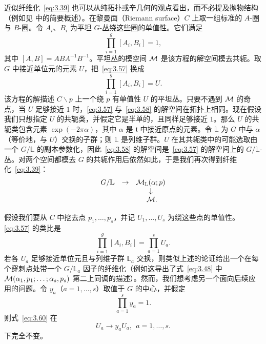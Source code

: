 近似纤维化~\eqref{eq:3.39} 也可以从纯拓扑或辛几何的观点看出，而不必提及抛物结构（例如见 \cite{ref56} 中的简要概述）。在黎曼面（Riemann surface）$C$ 上取一组标准的 $A$-圈与 $B$-圈。令 $A_i$、$B_i$ 为平坦 $G$-丛绕这些圈的单值性。它们满足
\setcounter{equation}{56}
\begin{equation}\label{eq:3.57}
  \prod_{i=1}^g[A_i,B_i]=1,
\end{equation}
其中 $[A,B]=ABA^{-1}B^{-1}$。平坦丛的模空间 ${\mathcal{M}}$ 是该方程的解空间模去共轭。取 $G$ 中接近单位元的元素 $U$，把~\eqref{eq:3.57} 换成
\setcounter{equation}{57}
\begin{equation}\label{eq:3.58}
  \prod_{i=1}^g[A_i,B_i]=U.
\end{equation}
该方程的解描述 $C\backslash p$ 上一个绕 $p$ 有单值性 $U$ 的平坦丛。只要不遇到 ${\mathcal{M}}$ 的奇点，当 $U$ 足够接近 $1$ 时，\eqref{eq:3.57} 与~\eqref{eq:3.58} 的解空间在拓扑上相同。现在假设我们只想指定 $U$ 的共轭类，并假定它是半单的，且同样足够接近 $1$。那么 $U$ 的共轭类包含元素 $\exp(-2\pi\alpha)$，其中 $\alpha$ 是 $\mathfrak t$ 中接近原点的元素。令 $\mathbb{L}$ 为 $G$ 中与 $\alpha$（等价地，与 $U$）交换的子群；则 $\mathbb{L}$ 是列维子群。$U$ 在其共轭类中的可能选取由一个 $G/\mathbb{L}$ 的副本参数化，因此~\eqref{eq:3.58} 的解空间是~\eqref{eq:3.57} 的解空间上的 $G/\mathbb{L}$-丛。对两个空间都模去 $G$ 的共轭作用后依然如此，于是我们再次得到纤维化~\eqref{eq:3.39}：
\setcounter{equation}{58}
\begin{equation}\label{eq:3.59}
  \begin{matrix}G/\mathbb{L}&\to& {\mathcal{M}}_\mathbb{L}(\alpha;p)\\
                                &   & \downarrow \\
                                & & ~{\mathcal{M}}. \end{matrix}
\end{equation}

假设我们要从 $C$ 中挖去点 $p_1,\dots,p_s$，并记 $U_1,\dots,U_s$ 为绕这些点的单值性。\eqref{eq:3.57} 的类比是
\setcounter{equation}{59}
\begin{equation}\label{eq:3.60}
  \prod_{i=1}^g[A_i,B_i]=\prod_{a=1}^s U_a.
\end{equation}
若各 $U_a$ 足够接近单位元且与列维子群 $\mathbb{L}_a$ 交换，则类似上述的论证给出一个在每个穿刺点处带一个 $G/\mathbb{L}_a$ 因子的纤维化（例如这导出了式~\eqref{eq:3.48} 中 ${\mathcal{M}}(\alpha_1,p_1;\dots;\alpha_s,p_s)$ 第二上同调的描述）。然而，我们想考虑另一个面向后续应用的问题。令 $y_a$（$a=1,\dots,s$）取值于 $G$ 的中心，并假定
\setcounter{equation}{60}
\begin{equation}\label{eq:3.61}
  \prod_{a=1}^sy_a=1.
\end{equation}
则式~\eqref{eq:3.60} 在
\setcounter{equation}{61}
\begin{equation}\label{eq:3.62}
  U_a\to y_aU_a,~~a=1,\dots,s.
\end{equation}
下完全不变。

